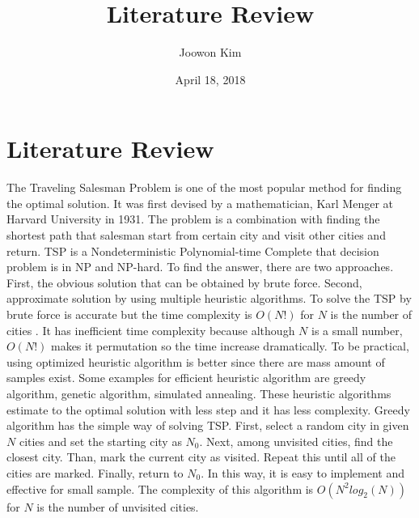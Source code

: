 \documentclass[12pt]{article}
\title{Literature Review}
\author{Joowon Kim}
\begin{document}
\date{April 18, 2018}
\maketitle
\section{Literature Review}
\hspace*{10mm} The Traveling Salesman Problem is one of the most popular method for finding the optimal solution. It was first devised by a mathematician, Karl Menger at Harvard University in 1931.\cite{journal3} The problem is a combination with finding the shortest path that salesman start from certain city and visit other cities and return. TSP is a Nondeterministic Polynomial-time Complete that decision problem is in NP and NP-hard.\cite{journal6} To find the answer, there are two approaches. First, the obvious solution that can be obtained by brute force. Second, approximate solution by using multiple heuristic algorithms. 
\newline
\hspace*{10mm} To solve the TSP by brute force is accurate but the time complexity is $O(N!)$ for $N$ is the number of cities \cite{techreport}. It has inefficient time complexity because although $N$ is a small number, $O(N!)$ makes it permutation so the time increase dramatically. To be practical, using optimized heuristic algorithm is better since there are mass amount of samples exist. Some examples for efficient heuristic algorithm are greedy algorithm,\cite{journal4} genetic algorithm,\cite{journal5} simulated annealing.\cite{journal} These heuristic algorithms estimate to the optimal solution with less step and it has less complexity.\newline 
\hspace*{10mm} Greedy algorithm has the simple way of solving TSP. First, select a random city in given $N$ cities and set the starting city as $N_0$. Next, among unvisited cities, find the closest city. Than, mark the current city as visited. Repeat this until all of the cities are marked. Finally, return to $N_0$. In this way, it is easy to implement and effective for small sample. The complexity of this algorithm is $O(N^2 log_2(N))$ for $N$ is the number of unvisited cities. 
\newline
\end{document}
